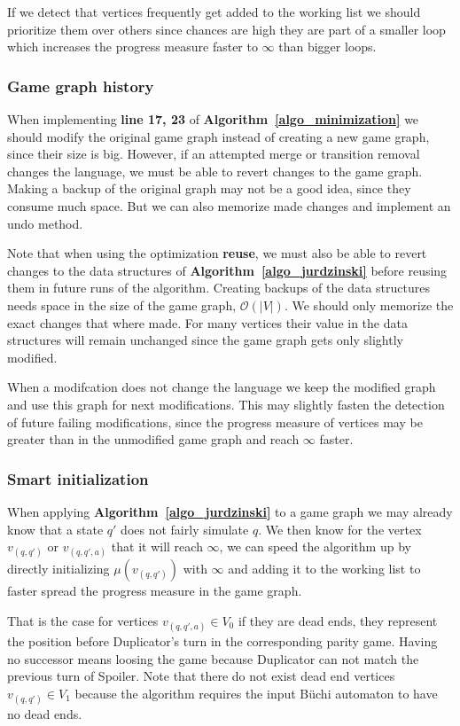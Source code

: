 \documentclass[12pt,oneside,bibliography=totoc,abstracton]{scrartcl}
\newcommand{\algoref}[1]{\textbf{Algorithm~\ref{#1}}}
\begin{document}
If we detect that vertices frequently get added to the working list we should prioritize them over others
since chances are high they are part of a smaller loop which increases the progress measure faster
to $\infty$ than bigger loops.

\subsubsection*{Game graph history}
When implementing \textbf{line 17, 23} of \algoref{algo_minimization} we should modify the original game
graph instead of creating a new game graph, since their size is big.
However, if an attempted merge or transition removal changes the language,
we must be able to revert changes to the game graph. Making a backup of the original graph may
not be a good idea, since they consume much space. But we can also memorize made changes and
implement an undo method.

Note that when using the optimization \textbf{reuse}, we must also be able to revert changes to the data
structures of \algoref{algo_jurdzinski} before reusing them in future runs of the algorithm.
Creating backups of the data structures needs space in the size of the game graph, $\mathcal{O}(|V|)$.
We should only memorize the exact changes that where made. For many vertices their value
in the data structures will remain unchanged since the game graph gets only slightly modified.

When a modifcation does not change the language we keep the modified graph and use this graph for next modifications.
This may slightly fasten the detection of future failing modifications, since the progress measure of vertices may
be greater than in the unmodified game graph and reach $\infty$ faster.

\subsubsection*{Smart initialization}
When applying \algoref{algo_jurdzinski} to a game graph we may already know that a state
$q'$ does not fairly simulate $q$. We then know for the vertex $v_{(q, q')}$ or $v_{(q, q', a)}$ that it will
reach $\infty$, we can speed the algorithm up by directly initializing $\mu(v_{(q, q')})$ with
$\infty$ and adding it to the working list to faster spread the progress measure in the game graph.

That is the case for vertices $v_{(q, q', a)} \in V_0$ if they are dead ends, they represent the position
before Duplicator's turn in the corresponding parity game.
Having no successor means loosing the game because Duplicator can not match the previous turn of Spoiler.
Note that there do not exist dead end vertices $v_{(q, q')} \in V_1$ because the algorithm
requires the input Büchi automaton to have no dead ends.
\end{document}
